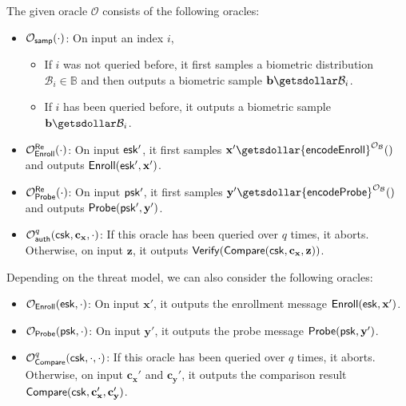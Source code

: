 The given oracle $\mathcal{O}$ consists of the following oracles:

\begin{itemize}
	\item $\mathcal{O}_{\sf samp}(\cdot)$: On input an index $i$,
	\begin{itemize}
		\item If $i$ was not queried before, it first samples a biometric distribution $\mathcal{B}_i \in \mathbb{B}$ and then outputs a biometric sample $\mathbf{b} \getsdollar \mathcal{B}_i$.
		\item If $i$ has been queried before, it outputs a biometric sample $\mathbf{b} \getsdollar \mathcal{B}_i$.
	\end{itemize}
	
	\item $\mathcal{O}_{\sf Enroll}^{ {\sf Re}} (\cdot)$: On input ${\sf esk'}$, it first samples $\mathbf{x'} \getsdollar {\sf encodeEnroll}^{\mathcal{O}_{\mathcal{B}}}()$ and outputs ${\sf Enroll}({\sf esk'}, \mathbf{x'})$.
	
	\item $\mathcal{O}_{\sf Probe}^{ {\sf Re}} (\cdot)$: On input ${\sf psk'}$, it first samples $\mathbf{y'} \getsdollar {\sf encodeProbe}^{\mathcal{O}_{\mathcal{B}}}()$ and outputs ${\sf Probe}({\sf psk'}, \mathbf{y'})$.

	\item $\mathcal{O}_{\sf auth}^{q}({\sf csk}, \mathbf{c_x}, \cdot)$: If this oracle has been queried over $q$ times, it aborts. Otherwise, on input $\mathbf{z}$, it outputs ${\sf Verify}({\sf Compare}({\sf csk}, \mathbf{c_x}, \mathbf{z}))$.
\end{itemize}

Depending on the threat model, we can also consider the following oracles:

\begin{itemize}
	\item $\mathcal{O}_{\sf Enroll}({\sf esk}, \cdot)$: On input $\mathbf{x'}$, it outputs the enrollment message ${\sf Enroll}({\sf esk}, \mathbf{x'})$.

	\item $\mathcal{O}_{\sf Probe}({\sf psk}, \cdot)$: On input $\mathbf{y'}$, it outputs the probe message ${\sf Probe}({\sf psk}, \mathbf{y'})$.

	\item $\mathcal{O}_{\sf Compare}^q({\sf csk}, \cdot, \cdot)$: If this oracle has been queried over $q$ times, it aborts. Otherwise, on input $\mathbf{c_x'}$ and $\mathbf{c_y'}$, it outputs the comparison result ${\sf Compare}( {\sf csk}, \mathbf{c_x'}, \mathbf{c_y'} )$.

\end{itemize}

